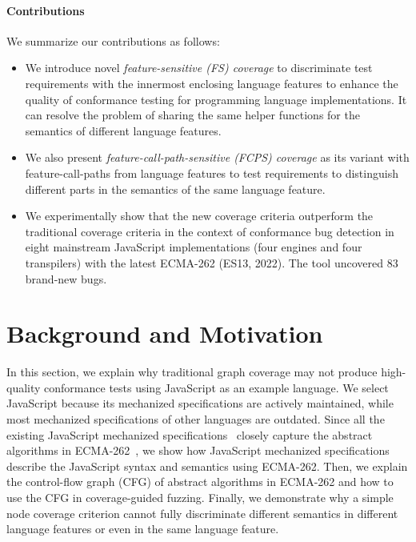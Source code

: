 \documentclass[acmsmall,review,screen]{acmart}
\begin{document}
\paragraph{\textbf{Contributions}}
We summarize our contributions as follows:
\begin{itemize}
  \item
    We introduce novel \textit{feature-sensitive (FS) coverage} to discriminate
    test requirements with the innermost enclosing language features to enhance
    the quality of conformance testing for programming language implementations.
    It can resolve the problem of sharing the same helper
    functions for the semantics of different language features.
  \item 
    We also present \textit{feature-call-path-sensitive (FCPS) coverage} as its
    variant with feature-call-paths from language features to test requirements
    to distinguish different parts in the semantics of the same language feature.
  \item
    We experimentally show that the new coverage criteria outperform
    the traditional coverage criteria in the
    context of conformance bug detection in eight mainstream
    JavaScript implementations (four engines and four transpilers) with the latest ECMA-262
    (ES13, 2022). The tool uncovered 83 brand-new bugs.
\end{itemize}

\section{Background and Motivation}\label{sec:motivation}

In this section, we explain why traditional graph coverage may not
produce high-quality conformance tests using JavaScript
as an example language. We select JavaScript because its
mechanized specifications are actively maintained,
while most mechanized specifications of other languages are outdated.
Since all the existing JavaScript mechanized specifications~\cite{kjs, javert, jiset,
skel-js} closely capture the abstract algorithms in ECMA-262~\cite{es13},
we show how JavaScript mechanized specifications
describe the JavaScript syntax and semantics using ECMA-262.
Then, we explain the control-flow graph (CFG) of abstract algorithms in ECMA-262
and how to use the CFG in coverage-guided fuzzing.
Finally, we demonstrate why a simple node coverage criterion cannot fully
discriminate different semantics in different language features or even in the
same language feature.
\end{document}
